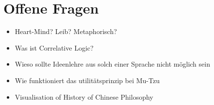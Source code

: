 \documentclass[a4paper, emulatestandardclasses]{scrartcl}
\begin{document}
\section*{Offene Fragen}

\begin{itemize}
  \item Heart-Mind? Leib? Metaphorisch?
  \item Was ist Correlative Logic?
  \item Wieso sollte Ideenlehre aus solch einer Sprache nicht möglich sein
  \item Wie funktioniert das utilitätsprinzip bei Mu-Tzu
  \item Visualisation of History of Chinese Philosophy
\end{itemize}




\end{document}
